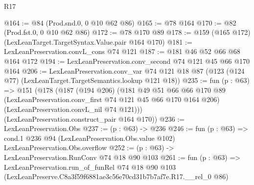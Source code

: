\begin{lexlean}{R17}
\begin{coremodule}
@164 := @84 (Prod.snd.{0, 0} @10 @62 @86)
@165 := @78 @164
@170 := @82 (Prod.fst.{0, 0} @10 @62 @86)
@172 := @78 @170 @89
@178 := @159 (@165 @172) (LexLeanTarget.TargetSyntax.Value.pair @164 @170)
@181 := LexLeanPreservation.convL_cons @74 @121
@187 := @181 @46 @52 @66 @68 @164 @172
@194 := LexLeanPreservation.conv_second @74 @121 @45 @66 @170 @164
@206 := LexLeanPreservation.conv_var
    @74
    @121
    @18
    @87
    (@123 (@124 @77) (LexLeanTarget.TargetSemantics.lookup @121 @18))
@235 := fun (p : @63) =>
  @151
    (@178
      (@187
        (@194 @206)
        (@181
          @49
          @51
          @66
          @66
          @170
          @89
          (LexLeanPreservation.conv_first @74 @121 @45 @66 @170 @164 @206)
          (LexLeanPreservation.convL_nil @74 @121)))
      (LexLeanPreservation.construct_pair @164 @170))
@236 := LexLeanPreservation.Obs
@237 := (p : @63) -> @236
@246 := fun (p : @63) =>
  cond.{1} @236 @94 (LexLeanPreservation.Obs.value @102) LexLeanPreservation.Obs.overflow
@252 := (p : @63) -> LexLeanPreservation.RunConv @74 @18 @90 @103
@261 := fun (p : @63) =>
  LexLeanPreservation.run_of_funRel
    @74
    @18
    @90
    @103
    (LexLeanPreserve.C8a3f59f6881ae3c56e70cd31b7b7af7e.R17.__rel_0 @86)
\end{coremodule}
\end{lexlean}
